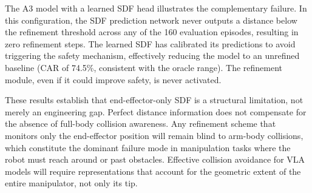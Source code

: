 The A3 model with a learned SDF head illustrates the complementary failure. In this configuration, the SDF prediction network never outputs a distance below the refinement threshold across any of the 160 evaluation episodes, resulting in zero refinement steps. The learned SDF has calibrated its predictions to avoid triggering the safety mechanism, effectively reducing the model to an unrefined baseline (CAR of 74.5\%, consistent with the oracle range). The refinement module, even if it could improve safety, is never activated.

These results establish that end-effector-only SDF is a structural limitation, not merely an engineering gap. Perfect distance information does not compensate for the absence of full-body collision awareness. Any refinement scheme that monitors only the end-effector position will remain blind to arm-body collisions, which constitute the dominant failure mode in manipulation tasks where the robot must reach around or past obstacles. Effective collision avoidance for VLA models will require representations that account for the geometric extent of the entire manipulator, not only its tip.
